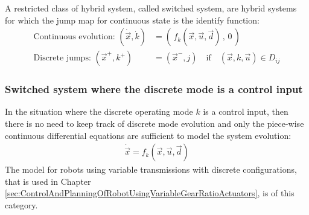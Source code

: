 A restricted class of hybrid system, called switched system, are hybrid systems for which the jump map for continuous state is the identify function:
%
\begin{align}
\text{Continuous evolution: } \left(  \dot{\vec{x}} , \dot{k} \right) &=  \left( \, f_k( \vec{x} , \vec{u} , \vec{d} ) \, , \, 0 \, \right) \\
\text{Discrete jumps: } \left(  \vec{x}^+ , k^+ \right) &=  \left( \vec{x}^- , j \right) \quad\text{if}\quad \left(  \vec{x} , k , \vec{u} \right) \in D_{ij} 
\end{align}
%

\subsubsection{Switched system where the discrete mode is a control input}

In the situation where the discrete operating mode $k$ is a control input, then there is no need to keep track of discrete mode evolution and only the piece-wise continuous differential equations are sufficient to model the system evolution:
%
\begin{align}
\dot{\vec{x}} = f_k( \vec{x} , \vec{u} , \vec{d} ) 
\end{align}
%
The model for robots using variable transmissions with discrete configurations, that is used in Chapter \ref{sec:ControlAndPlanningOfRobotUsingVariableGearRatioActuators}, is of this category. 
